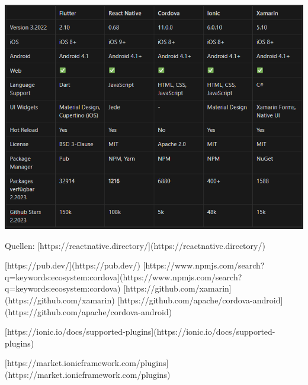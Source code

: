 \includegraphics[width=1\textwidth]{pics/temp-table.png}


Quellen:
[https://reactnative.directory/](https://reactnative.directory/)

[https://pub.dev/](https://pub.dev/)
[https://www.npmjs.com/search?q=keywords:ecosystem:cordova](https://www.npmjs.com/search?q=keywords:ecosystem:cordova)
[https://github.com/xamarin](https://github.com/xamarin)
[https://github.com/apache/cordova-android](https://github.com/apache/cordova-android)

[https://ionic.io/docs/supported-plugins](https://ionic.io/docs/supported-plugins)

[https://market.ionicframework.com/plugins](https://market.ionicframework.com/plugins)

